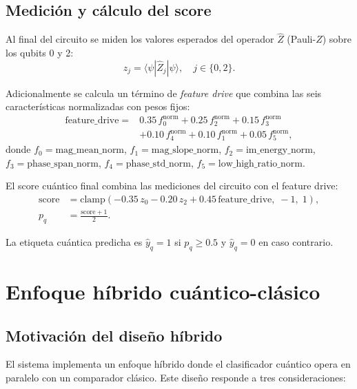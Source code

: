 \documentclass[11pt,a4paper,spanish]{book}
\begin{document}
\subsection{Medici\'{o}n y c\'{a}lculo del score}

Al final del circuito se miden los valores esperados del operador $\hat{Z}$ (Pauli-$Z$) sobre los qubits 0 y 2:
\begin{equation}
z_j = \langle \psi | \hat{Z}_j | \psi \rangle, \quad j \in \{0, 2\}.
\label{eq:expval-z}
\end{equation}

Adicionalmente se calcula un t\'{e}rmino de \textit{feature drive} que combina las seis caracter\'{i}sticas normalizadas con pesos fijos:
\begin{align}
\mathrm{feature\_drive} ={}& 0.35\,f_0^{\mathrm{norm}} + 0.25\,f_2^{\mathrm{norm}} + 0.15\,f_3^{\mathrm{norm}} \nonumber \\
& + 0.10\,f_4^{\mathrm{norm}} + 0.10\,f_1^{\mathrm{norm}} + 0.05\,f_5^{\mathrm{norm}},
\label{eq:feature-drive}
\end{align}
donde $f_0 = \text{mag\_mean\_norm}$, $f_1 = \text{mag\_slope\_norm}$, $f_2 = \text{im\_energy\_norm}$, $f_3 = \text{phase\_span\_norm}$, $f_4 = \text{phase\_std\_norm}$, $f_5 = \text{low\_high\_ratio\_norm}$.

El score cu\'{a}ntico final combina las mediciones del circuito con el feature drive:
\begin{align}
\mathrm{score} &= \mathrm{clamp}\!\left(-0.35\,z_0 - 0.20\,z_2 + 0.45\,\mathrm{feature\_drive},\; -1,\; 1\right), \label{eq:quantum-score} \\
p_q &= \frac{\mathrm{score} + 1}{2}. \label{eq:quantum-prob}
\end{align}

La etiqueta cu\'{a}ntica predicha es $\hat{y}_q = 1$ si $p_q \geq 0.5$ y $\hat{y}_q = 0$ en caso contrario.

\section{Enfoque h\'{i}brido cu\'{a}ntico-cl\'{a}sico}

\subsection{Motivaci\'{o}n del dise\~{n}o h\'{i}brido}

El sistema implementa un enfoque h\'{i}brido donde el clasificador cu\'{a}ntico opera en paralelo con un comparador cl\'{a}sico. Este dise\~{n}o responde a tres consideraciones:
\end{document}

